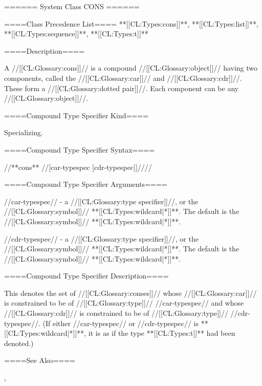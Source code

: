 ====== System Class CONS ======

====Class Precedence List==== **[[CL:Types:cons]]**, **[[CL:Types:list]]**, **[[CL:Types:sequence]]**, **[[CL:Types:t]]**

====Description====

A //[[CL:Glossary:cons]]// is a compound //[[CL:Glossary:object]]// having two components, called the //[[CL:Glossary:car]]// and //[[CL:Glossary:cdr]]//. These form a //[[CL:Glossary:dotted pair]]//. Each component can be any //[[CL:Glossary:object]]//.

====Compound Type Specifier Kind====

Specializing.

====Compound Type Specifier Syntax====

//**cons** //[car-typespec [cdr-typespec]]////

====Compound Type Specifier Arguments====

//car-typespec// - a //[[CL:Glossary:type specifier]]//, or the //[[CL:Glossary:symbol]]// **[[CL:Types:wildcard|*]]**. The default is the //[[CL:Glossary:symbol]]// **[[CL:Types:wildcard|*]]**.

//cdr-typespec// - a //[[CL:Glossary:type specifier]]//, or the //[[CL:Glossary:symbol]]// **[[CL:Types:wildcard|*]]**. The default is the //[[CL:Glossary:symbol]]// **[[CL:Types:wildcard|*]]**.

====Compound Type Specifier Description====

This denotes the set of //[[CL:Glossary:conses]]// whose //[[CL:Glossary:car]]// is constrained to be of //[[CL:Glossary:type]]// //car-typespec// and whose //[[CL:Glossary:cdr]]// is constrained to be of //[[CL:Glossary:type]]// //cdr-typespec//. (If either //car-typespec// or //cdr-typespec// is **[[CL:Types:wildcard|*]]**, it is as if the type **[[CL:Types:t]]** had been denoted.)

====See Also====

{\secref\LeftParen}, {\secref\PrintingListsAndConses}

